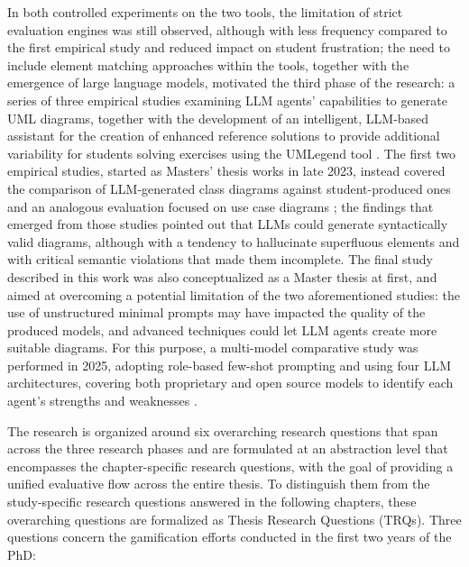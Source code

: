 In both controlled experiments on the two tools, the limitation of strict evaluation engines was still observed, although with less frequency compared to the first empirical study and reduced impact on student frustration; the need to include element matching approaches within the tools, together with the emergence of large language models, motivated the third phase of the research: a series of three empirical studies examining LLM agents' capabilities to generate UML diagrams, together with the development of an intelligent, LLM-based assistant for the creation of enhanced reference solutions to provide additional variability for students solving exercises using the UMLegend tool \cite{garaccione2026automated}. The first two empirical studies, started as Masters' thesis works in late 2023, instead covered the comparison of LLM-generated class diagrams against student-produced ones \cite{debari2024evaluating} and an analogous evaluation focused on use case diagrams \cite{garaccione2025vega}; the findings that emerged from those studies pointed out that LLMs could generate syntactically valid diagrams, although with a tendency to hallucinate superfluous elements and with critical semantic violations that made them incomplete. The final study described in this work was also conceptualized as a Master thesis at first, and aimed at overcoming a potential limitation of the two aforementioned studies: the use of unstructured minimal prompts may have impacted the quality of the produced models, and advanced techniques could let LLM agents create more suitable diagrams. For this purpose, a multi-model comparative study was performed in 2025, adopting role-based few-shot prompting and using four LLM architectures, covering both proprietary and open source models to identify each agent's strengths and weaknesses \cite{garaccione2025models}.

The research is organized around six overarching research questions that span across the three research phases and are formulated at an abstraction level that encompasses the chapter-specific research questions, with the goal of providing a unified evaluative flow across the entire thesis. To distinguish them from the study-specific research questions answered in the following chapters, these overarching questions are formalized as Thesis Research Questions (TRQs). Three questions concern the gamification efforts conducted in the first two years of the PhD:

